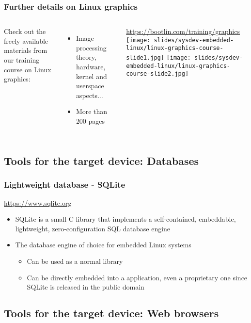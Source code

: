 \begin{frame}
  \frametitle{Further details on Linux graphics}
  \begin{columns}
    Check out the freely available materials
    from our training course on Linux graphics:
    \begin{itemize}
      \item Image processing theory, hardware,
            kernel and userspace aspects...
      \item More than 200 pages
    \end{itemize}
    \url{https://bootlin.com/training/graphics}
    \texttt{[image: slides/sysdev-embedded-linux/linux-graphics-course-slide1.jpg]}
    \texttt{[image: slides/sysdev-embedded-linux/linux-graphics-course-slide2.jpg]}
  \end{columns}
\end{frame}

\subsection[Databases]{Tools for the target device: Databases}

\begin{frame}
  \frametitle{Lightweight database - SQLite}
  \url{https://www.sqlite.org}

  \begin{itemize}
  \item SQLite is a small C library that implements a self-contained,
    embeddable, lightweight, zero-configuration SQL database engine
  \item The database engine of choice for embedded Linux systems
    \begin{itemize}
    \item Can be used as a normal library
    \item Can be directly embedded into a application, even a
      proprietary one since SQLite is released in the public domain
    \end{itemize}
  \end{itemize}
\end{frame}

\subsection[Web Browsers]{Tools for the target device: Web browsers}

